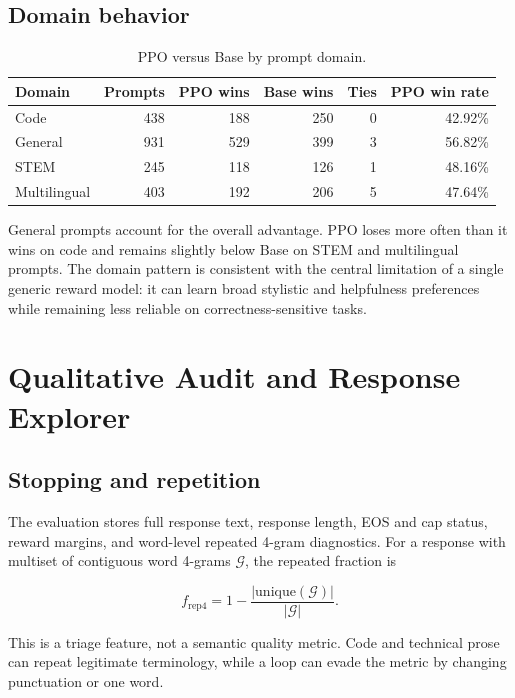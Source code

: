 \documentclass[11pt]{article}
\begin{document}
\subsection{Domain behavior}

\begin{table}[H]
\centering
\caption{PPO versus Base by prompt domain.}
\label{tab:domains}
\begin{tabular}{@{}lrrrrr@{}}
\toprule
\textbf{Domain} &
\textbf{Prompts} &
\textbf{PPO wins} &
\textbf{Base wins} &
\textbf{Ties} &
\textbf{PPO win rate}\\
\midrule
Code & 438 & 188 & 250 & 0 & 42.92\%\\
General & 931 & 529 & 399 & 3 & 56.82\%\\
STEM & 245 & 118 & 126 & 1 & 48.16\%\\
Multilingual & 403 & 192 & 206 & 5 & 47.64\%\\
\bottomrule
\end{tabular}
\end{table}

General prompts account for the overall advantage. PPO loses more often than
it wins on code and remains slightly below Base on STEM and multilingual
prompts. The domain pattern is consistent with the central limitation of a
single generic reward model: it can learn broad stylistic and helpfulness
preferences while remaining less reliable on correctness-sensitive tasks.

\section{Qualitative Audit and Response Explorer}
\label{sec:audit}

\subsection{Stopping and repetition}

The evaluation stores full response text, response length, EOS and cap status,
reward margins, and word-level repeated 4-gram diagnostics. For a response
with multiset of contiguous word 4-grams $\mathcal{G}$, the repeated fraction
is

\begin{equation}
f_{\mathrm{rep4}}
=
1-\frac{|\mathrm{unique}(\mathcal{G})|}{|\mathcal{G}|}.
\end{equation}

This is a triage feature, not a semantic quality metric. Code and technical
prose can repeat legitimate terminology, while a loop can evade the metric by
changing punctuation or one word.
\end{document}
